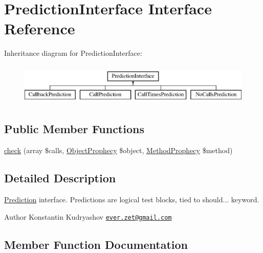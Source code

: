 \hypertarget{interface_prophecy_1_1_prediction_1_1_prediction_interface}{}\section{Prediction\+Interface Interface Reference}
\label{interface_prophecy_1_1_prediction_1_1_prediction_interface}
Inheritance diagram for Prediction\+Interface\+:\begin{figure}[H]
\begin{center}
\leavevmode
\includegraphics[height=2.000000cm]{interface_prophecy_1_1_prediction_1_1_prediction_interface}
\end{center}
\end{figure}
\subsection*{Public Member Functions}
\begin{DoxyCompactItemize}
\item 
\mbox{\hyperlink{interface_prophecy_1_1_prediction_1_1_prediction_interface_a8753cea9fc952add136830abab587633}{check}} (array \$calls, \mbox{\hyperlink{class_prophecy_1_1_prophecy_1_1_object_prophecy}{Object\+Prophecy}} \$object, \mbox{\hyperlink{class_prophecy_1_1_prophecy_1_1_method_prophecy}{Method\+Prophecy}} \$method)
\end{DoxyCompactItemize}


\subsection{Detailed Description}
\mbox{\hyperlink{namespace_prophecy_1_1_prediction}{Prediction}} interface. Predictions are logical test blocks, tied to {\ttfamily should...} keyword.

\begin{DoxyAuthor}{Author}
Konstantin Kudryashov \href{mailto:ever.zet@gmail.com}{\tt ever.\+zet@gmail.\+com} 
\end{DoxyAuthor}


\subsection{Member Function Documentation}
\mbox{\label{interface_prophecy_1_1_prediction_1_1_prediction_interface_a8753cea9fc952add136830abab587633}} 
